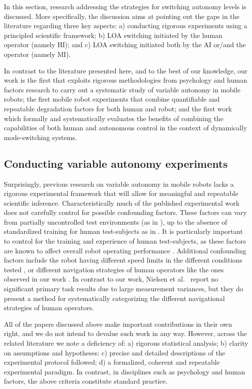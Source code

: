 \documentclass[a4paper,12pt,oneside,openright]{bhamthesis}
\begin{document}
In this section, research addressing the strategies for switching autonomy levels is discussed. More specifically, the discussion aims at pointing out the gaps in the literature regarding three key aspects: a) conducting rigorous experiments using a principled scientific framework; b) LOA switching initiated by the human operator (namely HI); and c) LOA switching initiated both by the AI or/and the operator (namely MI). 

In contrast to the literature presented here, and to the best of our knowledge, our work is the first that exploits rigorous methodologies from psychology and human factors research to carry out a systematic study of variable autonomy in mobile robots; the first mobile robot experiments that combine quantifiable and repeatable degradation factors for both human and robot; and the first work which formally and systematically evaluates the benefits of combining the capabilities of both human and autonomous control in the context of dynamically mode-switching systems. 

\subsection{Conducting variable autonomy experiments}\label{section:framework_lit}
Surprisingly, previous research on variable autonomy in mobile robots lacks a rigorous experimental framework that will allow for meaningful and repeatable scientific inference. Characteristically much of the published experimental work does not carefully control for possible confounding factors. These factors can vary from partially uncontrolled test environments (as in \cite{Marble2004}), up to the absence of standardized training for human test-subjects as in \cite{Bruemmer2005,Few2006, Bruemmer2004}. It is particularly important to control for the training and experience of human test-subjects, as these factors are known to affect overall robot operating performance \cite{Bruemmer2008, Armstrong2015}. Additional confounding factors include the robot having different speed limits in the different conditions tested \cite{Few2006}, or different navigation strategies of human operators like the ones observed in our work \cite{Chiou2015}. In contrast to our work, Nielsen et al.~\cite{Nielsen2008} report no significant primary task results due to large measurement variances, but they do present a method for systematically categorizing the different navigational strategies of human operators.  

All of the papers discussed above make important contributions in their own right, and we do not intend to devalue such work in any way. However, across the related literature we note a deficiency of: a) rigorous statistical analysis; b) clarity on assumptions and hypotheses; c) precise and detailed descriptions of the experimental protocol followed; d) a formalized, coherent and repeatable experimental paradigm. In contrast, in disciplines such as psychology and human factors, the above criteria constitute standard practice.
\end{document}
